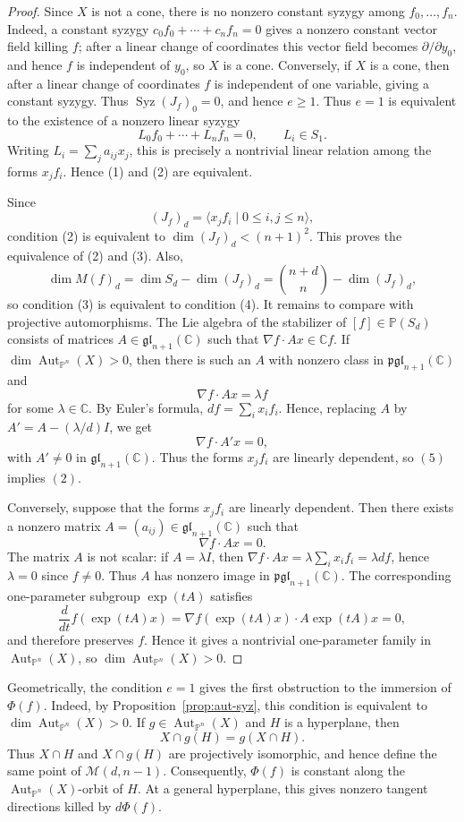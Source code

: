 \documentclass[11pt]{amsart}
\theoremstyle{plain}
\theoremstyle{definition}
\numberwithin{equation}{section}
\newcommand{\M}{{\mathcal M}}
\newcommand{\C}{\mathbb{C}}
\newcommand{\PP}{\mathbb{P}}
\DeclareMathOperator{\Aut}{Aut}
\begin{document}
\begin{proof}
Since $X$ is not a cone, there is no nonzero constant syzygy among
$f_0,\ldots,f_n$. Indeed, a constant syzygy
$c_0f_0+\cdots+c_nf_n=0$ gives a nonzero constant vector field killing $f$;
after a linear change of coordinates this vector field becomes
$\partial/\partial y_0$, and hence $f$ is independent of $y_0$, so $X$ is a
cone. Conversely, if $X$ is a cone, then after a linear change of coordinates
$f$ is independent of one variable, giving a constant syzygy. Thus
$\operatorname{Syz}(J_f)_0=0$, and hence $e\geq1$.
Thus $e=1$ is equivalent to the existence of a nonzero linear syzygy
\[
L_0f_0+\cdots+L_nf_n=0,\qquad L_i\in S_1.
\]
Writing $L_i=\sum_j a_{ij}x_j$, this is precisely a nontrivial linear relation
among the forms $x_jf_i$. Hence (1) and (2) are equivalent.

Since
\[
(J_f)_d=\langle x_jf_i\mid 0\leq i,j\leq n\rangle,
\]
condition (2) is equivalent to $\dim (J_f)_d<(n+1)^2$. This proves the equivalence of (2) and (3). Also,
\[
\dim M(f)_d=\dim S_d-\dim (J_f)_d
=\binom{n+d}{n}-\dim (J_f)_d,
\]
so condition (3) is equivalent to condition (4).
It remains to compare with projective automorphisms. The Lie algebra of the
stabilizer of $[f]\in \PP(S_d)$ consists of matrices $A\in\mathfrak{gl}_{n+1}(\C)$
such that $\nabla f\cdot Ax\in \C f$. If $\dim\Aut_{\PP^n}(X)>0$, then there is
such an $A$ with nonzero class in $\mathfrak{pgl}_{n+1}(\C)$ and
\[
\nabla f\cdot Ax=\lambda f
\]
for some $\lambda\in\C$. By Euler's formula, $df=\sum_i x_if_i$. Hence, replacing
$A$ by $A'=A-(\lambda/d)I$, we get
\[
\nabla f\cdot A'x=0,
\]
with $A'\neq 0$ in $\mathfrak{gl}_{n+1}(\C)$. Thus the forms $x_jf_i$ are linearly
dependent, so $(5)$ implies $(2)$. 

Conversely, suppose that the forms $x_jf_i$ are linearly dependent. Then there
exists a nonzero matrix $A=(a_{ij})\in\mathfrak{gl}_{n+1}(\C)$ such that
\[
\nabla f\cdot Ax=0.
\]
The matrix $A$ is not scalar: if $A=\lambda I$, then
$\nabla f\cdot Ax=\lambda\sum_i x_if_i=\lambda d f$, hence $\lambda=0$ since
$f\neq0$. Thus $A$ has nonzero image in $\mathfrak{pgl}_{n+1}(\C)$. The
corresponding one-parameter subgroup $\exp(tA)$ satisfies
\[
\frac{d}{dt}f(\exp(tA)x)=\nabla f(\exp(tA)x)\cdot A\exp(tA)x=0,
\]
and therefore preserves $f$. Hence it gives a nontrivial one-parameter family
in $\Aut_{\PP^n}(X)$, so $\dim\Aut_{\PP^n}(X)>0$.
\end{proof}

Geometrically, the condition $e=1$ gives the first obstruction to the immersion
of $\Phi(f)$. Indeed, by Proposition~\ref{prop:aut-syz}, this condition is
equivalent to $\dim\Aut_{\PP^n}(X)>0$. If $g\in\Aut_{\PP^n}(X)$ and $H$ is a
hyperplane, then
\[
X\cap g(H)=g(X\cap H).
\]
Thus $X\cap H$ and $X\cap g(H)$ are projectively isomorphic, and hence define
the same point of $\M(d,n-1)$. Consequently, $\Phi(f)$ is constant along the
$\Aut_{\PP^n}(X)$-orbit of $H$. At a general hyperplane, this gives nonzero
tangent directions killed by $d\Phi(f)$.
\end{document}
